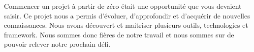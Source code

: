 Commencer un projet à partir de zéro était une opportunité que vous devaient saisir. Ce projet nous a permis d'évoluer, d'approfondir et d'acquérir de nouvelles connaissances. Nous avons découvert et maitriser plusieurs outils, technologies et framework. Nous sommes donc fières de notre travail et nous sommes sur de pouvoir relever notre prochain défi.\\
